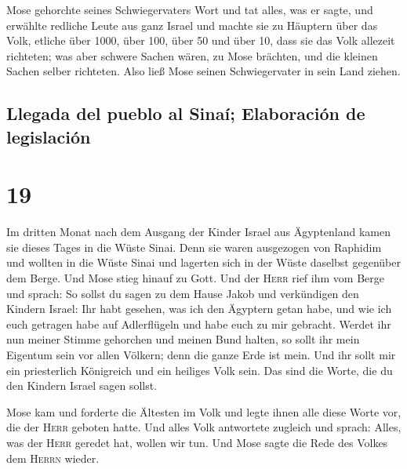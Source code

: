  Mose gehorchte seines Schwiegervaters Wort und tat
alles, was er sagte,  und erwählte redliche Leute aus
ganz Israel und machte sie zu Häuptern über das Volk, etliche über 1000,
über 100, über 50 und über 10,  dass sie das Volk
allezeit richteten; was aber schwere Sachen wären, zu Mose brächten, und
die kleinen Sachen selber richteten.  Also ließ Mose
seinen Schwiegervater in sein Land ziehen.

\hypertarget{llegada-del-pueblo-al-sinauxed-elaboraciuxf3n-de-legislaciuxf3n}{%
\subsection{Llegada del pueblo al Sinaí; Elaboración de
legislación}\label{llegada-del-pueblo-al-sinauxed-elaboraciuxf3n-de-legislaciuxf3n}}

\hypertarget{section-18}{%
\section{19}\label{section-18}}

 Im dritten Monat nach dem Ausgang der Kinder Israel aus
Ägyptenland kamen sie dieses Tages in die Wüste Sinai. 
Denn sie waren ausgezogen von Raphidim und wollten in die Wüste Sinai
und lagerten sich in der Wüste daselbst gegenüber dem Berge.
 Und Mose stieg hinauf zu Gott. Und der \textsc{Herr} rief
ihm vom Berge und sprach: So sollst du sagen zu dem Hause Jakob und
verkündigen den Kindern Israel:  Ihr habt gesehen, was ich
den Ägyptern getan habe, und wie ich euch getragen habe auf Adlerflügeln
und habe euch zu mir gebracht.  Werdet ihr nun meiner
Stimme gehorchen und meinen Bund halten, so sollt ihr mein Eigentum sein
vor allen Völkern; denn die ganze Erde ist mein.  Und ihr
sollt mir ein priesterlich Königreich und ein heiliges Volk sein. Das
sind die Worte, die du den Kindern Israel sagen sollst.

 Mose kam und forderte die Ältesten im Volk und legte
ihnen alle diese Worte vor, die der \textsc{Herr} geboten hatte.
 Und alles Volk antwortete zugleich und sprach: Alles, was
der \textsc{Herr} geredet hat, wollen wir tun. Und Mose sagte die Rede
des Volkes dem \textsc{Herrn} wieder.

